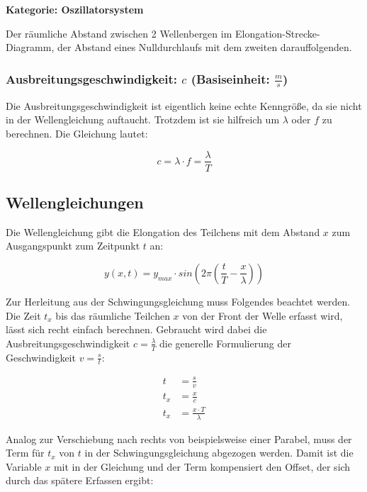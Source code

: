 \textbf{Kategorie: Oszillatorsystem}

Der räumliche Abstand zwischen 2 Wellenbergen im Elongation-Strecke-Diagramm, der Abstand eines Nulldurchlaufs mit dem zweiten darauffolgenden.



\subsubsection[Ausbreitungsgeschwindigkeit]{Ausbreitungsgeschwindigkeit: $c$ (Basiseinheit: $\frac{m}{s}$)}

Die Ausbreitungsgeschwindigkeit ist eigentlich keine echte Kenngröße, da sie nicht in der Wellengleichung auftaucht. Trotzdem ist sie hilfreich um $\lambda$ oder $f$ zu berechnen. Die Gleichung lautet:

\begin{equation} \label{eq:wellen_c}
	c=\lambda \cdot f=\frac{\lambda}{T}
\end{equation}



\subsection{Wellengleichungen}

Die Wellengleichung gibt die Elongation des Teilchens mit dem Abstand $x$ zum Ausgangspunkt zum Zeitpunkt $t$ an:

\begin{equation} \label{eq:wellengleichung_y}
	y(x,t) = y_{max} \cdot sin{ (2\pi(\frac{t}{T}-\frac{x}{\lambda})) }
\end{equation}

Zur Herleitung aus der Schwingungsgleichung muss Folgendes beachtet werden. Die Zeit $t_x$ bis das räumliche Teilchen $x$ von der Front der Welle erfasst wird, lässt sich recht einfach berechnen. Gebraucht wird dabei die Ausbreitungsgeschwindigkeit $c=\frac{\lambda}{T}$ die generelle Formulierung der Geschwindigkeit $v=\frac{s}{t}$:

\begin{align*}
	t   &= \frac{s}{v} \\
	t_x &= \frac{x}{c} \\
	t_x &= \frac{x \cdot T}{\lambda}
\end{align*}

Analog zur Verschiebung nach rechts von beispielsweise einer Parabel, muss der Term für $t_x$ von $t$ in der Schwingungsgleichung abgezogen werden. Damit ist die Variable $x$ mit in der Gleichung und der Term \glqq kompensiert\grqq{} den \glqq Offset\grqq{}, der sich durch das spätere Erfassen ergibt:

